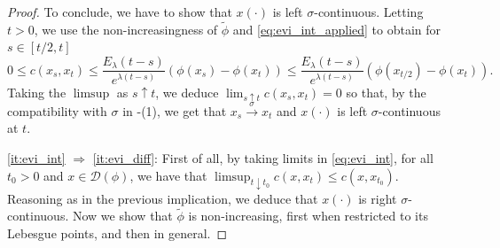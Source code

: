 \documentclass[reqno]{amsart}
\theoremstyle{plain}
\theoremstyle{remark}
\theoremstyle{plain}
\numberwithin{equation}{section}
\theoremstyle{remark}
\newcommand{\dom}[1]{\mathscr{D}(#1)}
\begin{document}
\begin{proof}
 To conclude, we have to show that $x(\cdot)$ is left $\sigma$-continuous.  Letting   $t>0$, we use the non-increasingness of $\tilde \phi$ and \eqref{eq:evi_int_applied} to obtain for $s\in[t/2,t]$
 \begin{equation}\label{eq:evi_int_applied2}
    0\le c(x_s,x_t) \le \frac{E_\lambda(t-s)}{  e^{\lambda(t-s)}}(\phi(x_s)-\phi(x_{t})) \le \frac{E_\lambda(t-s)}{  e^{\lambda(t-s)}}(\phi(x_{t/2})-\phi(x_{t})).
\end{equation}
Taking the  $\limsup$ as $s\uparrow t$, we  deduce  $\lim_{s \uparrow t} c(x_s,x_t)=0$ so that, by the compatibility with $\sigma$ in -(1), we get that  $x_s \stackrel{\sigma}{\to} x_t$ and   $x(\cdot)$ is left $\sigma$-continuous at $t$.

 \ref{it:evi_int} $\Rightarrow$ \ref{it:evi_diff}:   First of all, by taking limits in \eqref{eq:evi_int}, for all $t_0>0$ and $x \in \dom{\phi}$, we have  that  $ \limsup_{t\downarrow t_0} c(x,x_t) \le c(x,x_{t_0})$.  Reasoning as in the previous implication, we deduce that $x(\cdot)$ is right $\sigma$-continuous. 
 Now we show that $\tilde{\phi}$ is non-increasing, first when restricted to its Lebesgue points, and then in general.


\end{proof}
\end{document}
